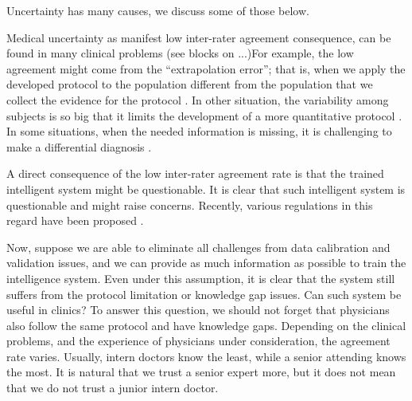 \documentclass[12pt]{article}
\begin{document}
Uncertainty has many causes, we discuss some of those below.

  Medical uncertainty as manifest low inter-rater agreement
  consequence, can be found in many clinical problems (see blocks on
  ...)For example, the low agreement might come from the
  ``extrapolation error''; that is, when we apply the developed
  protocol to the population different from the population that we
  collect the evidence for the protocol \cite{brosnan2015modest}.  In
  other situation, the variability among subjects is so big that it
  limits the development of a more quantitative protocol
  \cite{venhola2003interobserver}. In some situations, when the needed
  information is missing, it is challenging to make a differential
  diagnosis \cite{moncada2011reading}.

  A direct consequence of the low inter-rater agreement rate is that the trained intelligent system might be questionable. 
%  
It is clear that such intelligent system is questionable and might raise concerns. Recently, various regulations in this regard have been proposed \cite{price2014black,ford2016privacy}.


Now, suppose we are able to eliminate all challenges from data
calibration and validation issues, and we can provide as much
information as possible to train the intelligence system. Even under
this assumption, it is clear that the system still suffers from the
protocol limitation or knowledge gap issues. Can such system be useful
in clinics? To answer this question, we should not forget that
physicians also follow the same protocol and have knowledge
gaps. Depending on the clinical problems, and the experience of
physicians under consideration, the agreement rate varies. Usually,
intern doctors know the least, while a senior attending knows the
most. It is natural that we trust a senior expert more, but it does
not mean that we do not trust a junior intern doctor.
\end{document}
